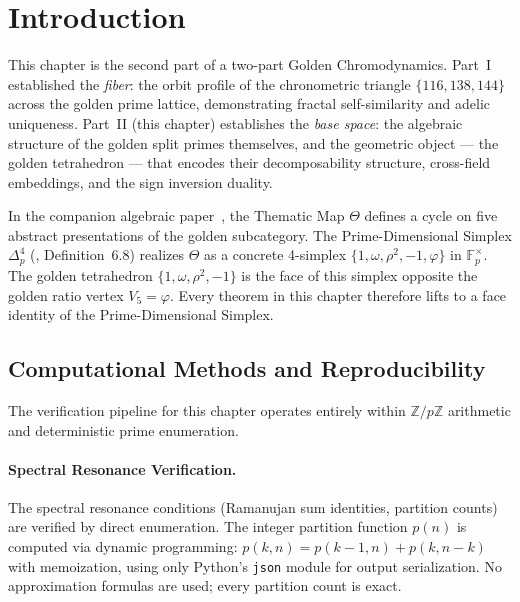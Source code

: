 \newpage

\section{Introduction}
\label{sec:intro}

This chapter is the second part of a two-part Golden Chromodynamics.
Part~I~\cite{dwm_fst} established the \emph{fiber}: the orbit
profile of the chronometric triangle $\{116, 138, 144\}$~\cite{lockwood_chrono} across
the golden prime lattice, demonstrating fractal self-similarity
and adelic uniqueness. Part~II (this chapter) establishes the
\emph{base space}: the algebraic structure of the golden split
primes themselves, and the geometric object --- the golden
tetrahedron --- that encodes their decomposability structure,
cross-field embeddings, and the sign inversion duality.

In the companion algebraic paper~\cite{larue_lc}, the Thematic Map
$\Theta$ defines a cycle on five abstract presentations of the golden
subcategory. The Prime-Dimensional Simplex $\Delta^4_p$
(\cite{larue_lc}, Definition~6.8) realizes $\Theta$ as a concrete
4-simplex $\{1, \omega, \rho^2, -1, \varphi\}$ in $\mathbb{F}_p^\times$.
The golden tetrahedron $\{1, \omega, \rho^2, -1\}$ is the face of
this simplex opposite the golden ratio vertex $V_5 = \varphi$. Every
theorem in this chapter therefore lifts to a face identity of the
Prime-Dimensional Simplex.


\subsection{Computational Methods and Reproducibility}

The verification pipeline for this chapter operates entirely within $\mathbb{Z}/p\mathbb{Z}$ arithmetic and deterministic prime enumeration.

\paragraph{Spectral Resonance Verification.}
The spectral resonance conditions (Ramanujan sum identities, partition counts) are verified by direct enumeration. The integer partition function $p(n)$ is computed via dynamic programming: $p(k, n) = p(k-1, n) + p(k, n-k)$ with memoization, using only Python's \texttt{json} module for output serialization. No approximation formulas are used; every partition count is exact.

